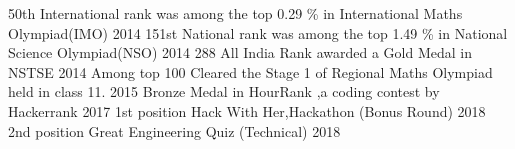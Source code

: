 \begin{cvhonors}
  \cvhonor
    {50th International rank}
    {was among the top 0.29 \% in International Maths Olympiad(IMO)}
    {}
    {2014} 
  \cvhonor
    {151st National rank}
    {was among the top 1.49 \% in National Science Olympiad(NSO)}
    {}
    {2014}
  \cvhonor
    {288 All India Rank}
    {awarded a Gold Medal in NSTSE}
    {}
    {2014}
  \cvhonor
    {Among top 100 }
    {Cleared the Stage 1 of Regional Maths Olympiad held in class 11.}
    {}
    {2015}
  \cvhonor
  {Bronze Medal}
  {in HourRank ,a coding contest by Hackerrank}
  {}
  {2017}
  \cvhonor
  {1st position}
  {Hack With Her,Hackathon (Bonus Round)}
  {}
  {2018}
  \cvhonor
  {2nd position}
  {Great Engineering Quiz (Technical)}
  {}
  {2018}
\end{cvhonors}


